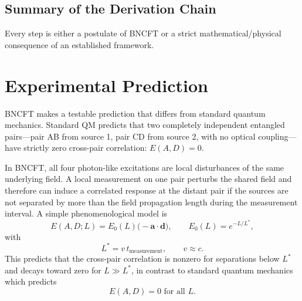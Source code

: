﻿\documentclass[11pt,a4paper]{article}
\begin{document}
\subsection{Summary of the Derivation Chain}

\begin{center}
\end{center}

Every step is either a postulate of BNCFT or a strict mathematical/physical consequence of an established framework.

\section{Experimental Prediction}

BNCFT makes a testable prediction that differs from standard quantum mechanics. Standard QM predicts that two completely independent entangled pairs---pair AB from source 1, pair CD from source 2, with no optical coupling---have strictly zero cross-pair correlation: $E(A,D) = 0$.

In BNCFT, all four photon-like excitations are local disturbances of the same underlying field. A local measurement on one pair perturbs the shared field and therefore can induce a correlated response at the distant pair if the sources are not separated by more than the field propagation length during the measurement interval. A simple phenomenological model is
\begin{equation}
E(A,D;L) = E_0(L)\big(-\mathbf{a}\cdot\mathbf{d}\big), \qquad E_0(L) = e^{-L/L^*},
\end{equation}
with
\begin{equation}
L^* = v\, t_{\text{measurement}}, \qquad v \approx c.
\end{equation}
This predicts that the cross-pair correlation is nonzero for separations below $L^*$ and decays toward zero for $L\gg L^*$, in contrast to standard quantum mechanics which predicts
\begin{equation}
E(A,D) = 0 \text{ for all } L.
\end{equation}
\end{document}
